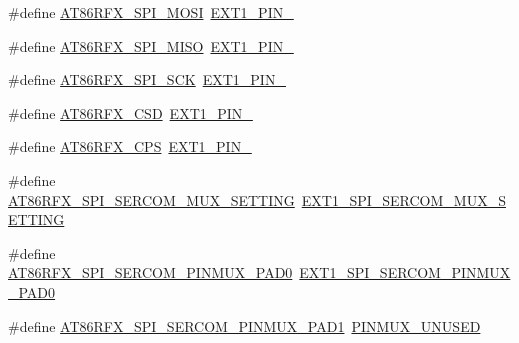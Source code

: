 \begin{DoxyCompactItemize}
\item 
\#define \mbox{\hyperlink{group__samd21__xplained__pro__group_ga8ab7848041b493dd995ab352d6152731}{A\+T86\+R\+F\+X\+\_\+\+S\+P\+I\+\_\+\+M\+O\+SI}}~\mbox{\hyperlink{group__samd21__xplained__pro__features__group_ga0b80b69996d0b582265a265f7a232df6}{E\+X\+T1\+\_\+\+P\+I\+N\+\_}}
\item 
\#define \mbox{\hyperlink{group__samd21__xplained__pro__group_gae94f4ee76dbc7c98914924139a00ce7c}{A\+T86\+R\+F\+X\+\_\+\+S\+P\+I\+\_\+\+M\+I\+SO}}~\mbox{\hyperlink{group__samd21__xplained__pro__features__group_ga197fec359c0525478beb868f1dee881c}{E\+X\+T1\+\_\+\+P\+I\+N\+\_}}
\item 
\#define \mbox{\hyperlink{group__samd21__xplained__pro__group_ga41fdd48f6f888b5ca6a7feb2f05d3854}{A\+T86\+R\+F\+X\+\_\+\+S\+P\+I\+\_\+\+S\+CK}}~\mbox{\hyperlink{group__samd21__xplained__pro__features__group_ga87e6c1040a86c8f03b5f21f58cf8c0b5}{E\+X\+T1\+\_\+\+P\+I\+N\+\_}}
\item 
\#define \mbox{\hyperlink{group__samd21__xplained__pro__group_ga430273647e1d67daca425814199d8263}{A\+T86\+R\+F\+X\+\_\+\+C\+SD}}~\mbox{\hyperlink{group__samd21__xplained__pro__features__group_ga5ca695ea694bce97dfb20e52de5b4a15}{E\+X\+T1\+\_\+\+P\+I\+N\+\_}}
\item 
\#define \mbox{\hyperlink{group__samd21__xplained__pro__group_gaba085369f8aff843cee2f8057b1c58f4}{A\+T86\+R\+F\+X\+\_\+\+C\+PS}}~\mbox{\hyperlink{group__samd21__xplained__pro__features__group_ga4768b3de92f5776c206a4e3262f05c47}{E\+X\+T1\+\_\+\+P\+I\+N\+\_}}
\item 
\#define \mbox{\hyperlink{group__samd21__xplained__pro__group_ga4663eb0da79c88b144a813e9761de3c4}{A\+T86\+R\+F\+X\+\_\+\+S\+P\+I\+\_\+\+S\+E\+R\+C\+O\+M\+\_\+\+M\+U\+X\+\_\+\+S\+E\+T\+T\+I\+NG}}~\mbox{\hyperlink{group__samd21__xplained__pro__features__group_ga8063a4c2e063318656a5441c80f53c0c}{E\+X\+T1\+\_\+\+S\+P\+I\+\_\+\+S\+E\+R\+C\+O\+M\+\_\+\+M\+U\+X\+\_\+\+S\+E\+T\+T\+I\+NG}}
\item 
\#define \mbox{\hyperlink{group__samd21__xplained__pro__group_gab6e5a51ab581ce47972810f020c0cc04}{A\+T86\+R\+F\+X\+\_\+\+S\+P\+I\+\_\+\+S\+E\+R\+C\+O\+M\+\_\+\+P\+I\+N\+M\+U\+X\+\_\+\+P\+A\+D0}}~\mbox{\hyperlink{group__samd21__xplained__pro__features__group_gaf15f22ea20148abf9d81973b73a76db6}{E\+X\+T1\+\_\+\+S\+P\+I\+\_\+\+S\+E\+R\+C\+O\+M\+\_\+\+P\+I\+N\+M\+U\+X\+\_\+\+P\+A\+D0}}
\item 
\#define \mbox{\hyperlink{group__samd21__xplained__pro__group_gae42390243121076aed22eb5510cc56cc}{A\+T86\+R\+F\+X\+\_\+\+S\+P\+I\+\_\+\+S\+E\+R\+C\+O\+M\+\_\+\+P\+I\+N\+M\+U\+X\+\_\+\+P\+A\+D1}}~\mbox{\hyperlink{group__asfdoc__sam0__sercom__usart__group_gaffde9ff712058ef836127e1f3368889e}{P\+I\+N\+M\+U\+X\+\_\+\+U\+N\+U\+S\+ED}}

\end{DoxyCompactItemize}
